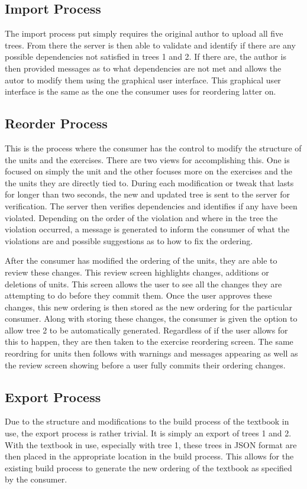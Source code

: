 \subsection{Import Process}

The import process put simply requires the original author to upload all five trees. From there the server is then able to validate and identify if there are any possible dependencies not satisfied in trees 1 and 2. If there are, the author is then provided messages as to what dependencies are not met and allows the autor to modify them using the graphical user interface. This graphical user interface is the same as the one the consumer uses for reordering latter on.

\subsection{Reorder Process}

This is the process where the consumer has the control to modify the structure of the units and the exercises. There are two views for accomplishing this. One is focused on simply the unit and the other focuses more on the exercises and the the units they are directly tied to. During each modification or tweak that lasts for longer than two seconds, the new and updated tree is sent to the server for verification. The server then verifies dependencies and identifies if any have been violated. Depending on the order of the violation and where in the tree the violation occurred, a message is generated to inform the consumer of what the violations are and possible suggestions as to how to fix the ordering.

After the consumer has modified the ordering of the units, they are able to review these changes. This review screen highlights changes, additions or deletions of units. This screen allows the user to see all the changes they are attempting to do before they commit them. Once the user approves these changes, this new ordering is then stored as the new ordering for the particular consumer. Along with storing these changes, the consumer is given the option to allow tree 2 to be automatically generated. Regardless of if the user allows for this to happen, they are then taken to the exercise reordering screen. The same reordring for units then follows with warnings and messages appearing as well as the review screen showing before a user fully commits their ordering changes. 

\subsection{Export Process}

Due to the structure and modifications to the build process of the textbook in use, the export process is rather trivial. It is simply an export of trees 1 and 2. With the textbook in use, especially with tree 1, these trees in JSON format are then placed in the appropriate location in the build process. This allows for the existing build process to generate the new ordering of the textbook as specified by the consumer.
